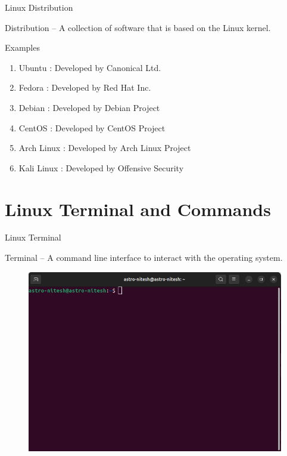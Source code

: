 \documentclass[aspectratio=169]{beamer}
\begin{document}
\begin{frame}{Linux Distribution}
    \begin{block}{Distribution}
        -- A collection of software that is based on the Linux kernel.
    \end{block}

    \begin{block}{Examples}
        \begin{enumerate}
            \item Ubuntu : Developed by Canonical Ltd.
            \item Fedora : Developed by Red Hat Inc.
            \item Debian : Developed by Debian Project
            \item CentOS : Developed by CentOS Project
            \item Arch Linux : Developed by Arch Linux Project
            \item Kali Linux : Developed by Offensive Security
        \end{enumerate}
    \end{block}
\end{frame}

\section{Linux Terminal and Commands}
\begin{frame}{Linux Terminal}
    \begin{block}{Terminal}
        -- A command line interface to interact with the operating system.
    \end{block}

    \begin{figure}[htpb]
        \begin{center}
            \includegraphics[keepaspectratio, scale=0.25]{pic/linux_terminal.png}
        \end{center}
    \end{figure}
\end{frame}
\end{document}
